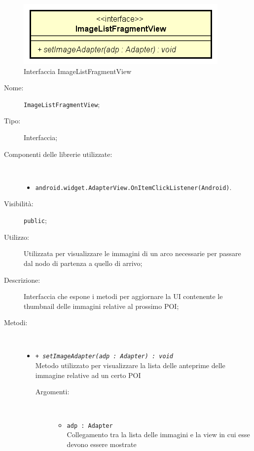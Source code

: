 \documentclass[../DefinizioneDiProdotto.tex]{subfiles}
\begin{document}
    \begin{figure}[H]
        \centering
        \includegraphics{img/ImageListFragmentView.png}
        \caption{Interfaccia ImageListFragmentView}\label{fig:view::ImageListFragmentView} 
    \end{figure}
    \begin{description}
\item[Nome:] \texttt{ImageListFragmentView};
\item[Tipo:] Interfaccia;
\item[Componenti delle librerie utilizzate:] \
\begin{itemize}
\item \texttt{android.widget.AdapterView.OnItemClickListener(Android)}.

\end{itemize}
\item[Visibilità:] \texttt{public};
\item[Utilizzo:] Utilizzata per visualizzare le immagini di un arco necessarie per passare dal nodo di partenza a quello di arrivo;
\item[Descrizione:] Interfaccia che espone i metodi per aggiornare la UI contenente le thumbnail delle immagini relative al prossimo POI;
\item[Metodi:] \
\begin{itemize}
\item \texttt{+ \textit{setImageAdapter(adp : Adapter) : void}}\\
Metodo utilizzato per visualizzare la lista delle anteprime delle immagine relative ad un certo POI
 \begin{description}
\item[Argomenti:] \
\begin{itemize}
\item \texttt{adp : Adapter}\\
Collegamento tra la lista delle immagini e la view in cui esse devono essere mostrate\end{itemize}
\end{description}
\end{itemize}
\end{description}
\end{document}
